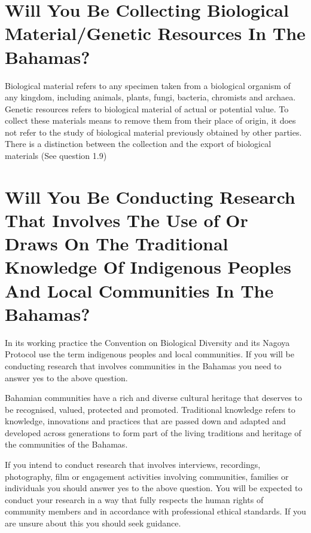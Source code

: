 \documentclass[
]{book}
\begin{document}
\hypertarget{will-you-be-collecting-biological-materialgenetic-resources-in-the-bahamas}{%
\section{Will You Be Collecting Biological Material/Genetic Resources In The Bahamas?}\label{will-you-be-collecting-biological-materialgenetic-resources-in-the-bahamas}}

Biological material refers to any specimen taken from a biological organism of any kingdom, including animals, plants, fungi, bacteria, chromists and archaea. Genetic resources refers to biological material of actual or potential value. To collect these materials means to remove them from their place of origin, it does not refer to the study of biological material previously obtained by other parties. There is a distinction between the collection and the export of biological materials (See question 1.9)

\hypertarget{will-you-be-conducting-research-that-involves-the-use-of-or-draws-on-the-traditional-knowledge-of-indigenous-peoples-and-local-communities-in-the-bahamas}{%
\section{Will You Be Conducting Research That Involves The Use of Or Draws On The Traditional Knowledge Of Indigenous Peoples And Local Communities In The Bahamas?}\label{will-you-be-conducting-research-that-involves-the-use-of-or-draws-on-the-traditional-knowledge-of-indigenous-peoples-and-local-communities-in-the-bahamas}}

In its working practice the Convention on Biological Diversity and its Nagoya Protocol use the term indigenous peoples and local communities. If you will be conducting research that involves communities in the Bahamas you need to answer yes to the above question.

Bahamian communities have a rich and diverse cultural heritage that deserves to be recognised, valued, protected and promoted. Traditional knowledge refers to knowledge, innovations and practices that are passed down and adapted and developed across generations to form part of the living traditions and heritage of the communities of the Bahamas.

If you intend to conduct research that involves interviews, recordings, photography, film or engagement activities involving communities, families or individuals you should answer yes to the above question. You will be expected to conduct your research in a way that fully respects the human rights of community members and in accordance with professional ethical standards. If you are unsure about this you should seek guidance.
\end{document}
